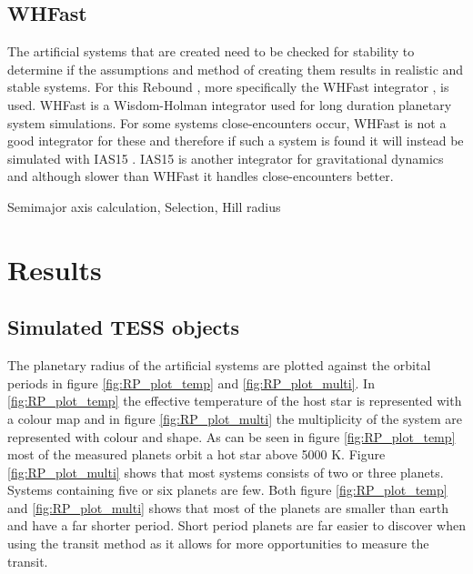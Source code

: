 \documentclass[12pt]{report}
\begin{document}
\section{WHFast}
	The artificial systems that are created need to be checked for stability to determine if the assumptions and method of creating them results in realistic and stable systems. For this Rebound \citep{2012A&A...537A.128R}, more specifically the WHFast integrator \citep{2015MNRAS.452..376R}, is used. WHFast is a Wisdom-Holman integrator used for long duration planetary system simulations. For some systems close-encounters occur, WHFast is not a good integrator for these and therefore if such a system is found it will instead be simulated with IAS15 \citep{2015MNRAS.446.1424R}. IAS15 is another integrator for gravitational dynamics and although slower than WHFast it handles close-encounters better.
	
	Semimajor axis calculation, Selection, Hill radius

\chapter{Results}

\section{Simulated TESS objects}
	The planetary radius of the artificial systems are plotted against the orbital periods in figure \ref{fig:RP_plot_temp} and \ref{fig:RP_plot_multi}. In \ref{fig:RP_plot_temp} the effective temperature of the host star is represented with a colour map and in figure \ref{fig:RP_plot_multi} the multiplicity of the system are represented with colour and shape. As can be seen in figure \ref{fig:RP_plot_temp} most of the measured planets orbit a hot star above 5000 K. Figure \ref{fig:RP_plot_multi} shows that most systems consists of two or three planets. Systems containing five or six planets are few. Both figure \ref{fig:RP_plot_temp} and \ref{fig:RP_plot_multi} shows that most of the planets are smaller than earth and have a far shorter period. Short period planets are far easier to discover when using the transit method as it allows for more opportunities to measure the transit.
\end{document}
